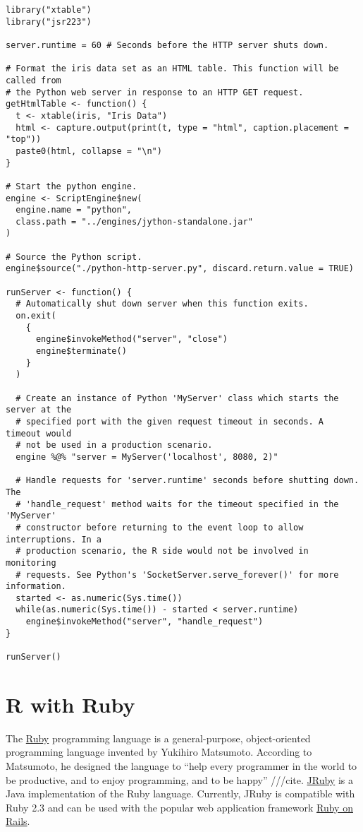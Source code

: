 \begin{verbatim}
library("xtable")
library("jsr223")

server.runtime = 60 # Seconds before the HTTP server shuts down.

# Format the iris data set as an HTML table. This function will be called from
# the Python web server in response to an HTTP GET request.
getHtmlTable <- function() {
  t <- xtable(iris, "Iris Data")
  html <- capture.output(print(t, type = "html", caption.placement = "top"))
  paste0(html, collapse = "\n")
}

# Start the python engine.
engine <- ScriptEngine$new(
  engine.name = "python",
  class.path = "../engines/jython-standalone.jar"
)

# Source the Python script.
engine$source("./python-http-server.py", discard.return.value = TRUE)

runServer <- function() {
  # Automatically shut down server when this function exits.
  on.exit(
    {
      engine$invokeMethod("server", "close")
      engine$terminate()
    }
  )
  
  # Create an instance of Python 'MyServer' class which starts the server at the
  # specified port with the given request timeout in seconds. A timeout would 
  # not be used in a production scenario.
  engine %@% "server = MyServer('localhost', 8080, 2)"
  
  # Handle requests for 'server.runtime' seconds before shutting down. The 
  # 'handle_request' method waits for the timeout specified in the 'MyServer' 
  # constructor before returning to the event loop to allow interruptions. In a
  # production scenario, the R side would not be involved in monitoring 
  # requests. See Python's 'SocketServer.serve_forever()' for more information.
  started <- as.numeric(Sys.time())
  while(as.numeric(Sys.time()) - started < server.runtime)
    engine$invokeMethod("server", "handle_request")
}

runServer()
\end{verbatim}

\section{R with Ruby}

The \href{https://www.ruby-lang.org}{Ruby} programming language is a general-purpose, object-oriented programming language invented by Yukihiro Matsumoto. According to Matsumoto, he designed the language to “help every programmer in the world to be productive, and to enjoy programming, and to be happy” ///cite. \href{http://jruby.org/}{JRuby} is a Java implementation of the Ruby language. Currently, JRuby is compatible with Ruby 2.3 and can be used with the popular web application framework \href{http://rubyonrails.org/}{Ruby on Rails}.


